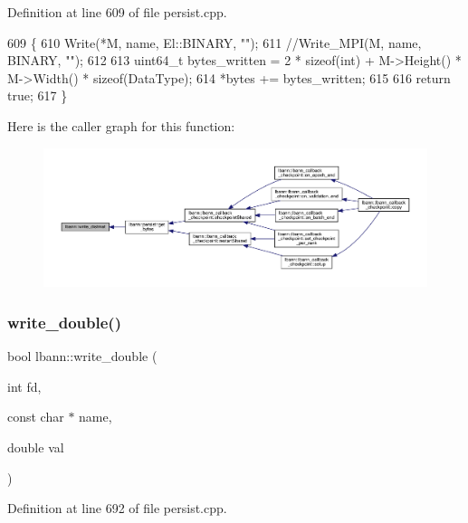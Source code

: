 Definition at line 609 of file persist.\+cpp.


\begin{DoxyCode}
609                                                                                \{
610   Write(*M, name, El::BINARY, \textcolor{stringliteral}{""});
611   \textcolor{comment}{//Write\_MPI(M, name, BINARY, "");}
612 
613   uint64\_t bytes\_written = 2 * \textcolor{keyword}{sizeof}(int) + M->Height() * M->Width() * \textcolor{keyword}{sizeof}(DataType);
614   *bytes += bytes\_written;
615 
616   \textcolor{keywordflow}{return} \textcolor{keyword}{true};
617 \}
\end{DoxyCode}
Here is the caller graph for this function\+:\nopagebreak
\begin{figure}[H]
\begin{center}
\leavevmode
\includegraphics[width=350pt]{namespacelbann_aa7b4e710f444588dfcf4188b84b33420_icgraph}
\end{center}
\end{figure}
\mbox{\label{namespacelbann_a827b050911630a21f248b128e3859044}} 
\subsubsection{\texorpdfstring{write\+\_\+double()}{write\_double()}}
{\footnotesize\ttfamily bool lbann\+::write\+\_\+double (\begin{DoxyParamCaption}\item[{int}]{fd,  }\item[{const char $\ast$}]{name,  }\item[{double}]{val }\end{DoxyParamCaption})}



Definition at line 692 of file persist.\+cpp.


